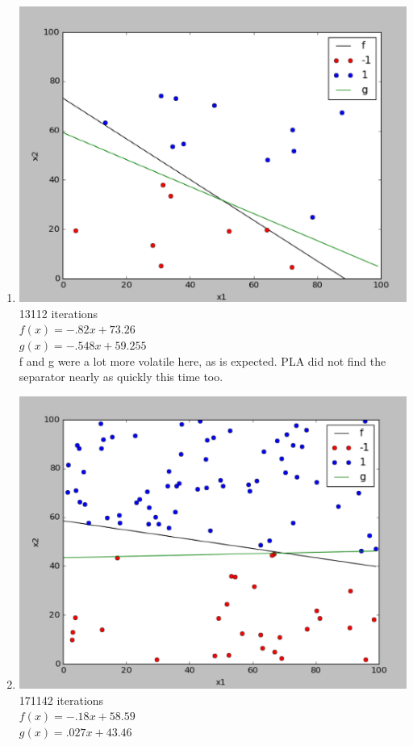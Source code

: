 \documentclass[12pt]{article}
\begin{document}
\begin{enumerate}[label=(\alph*)]
	\item \includegraphics[scale=.5]{1-4-5.png}
	\\ 13112 iterations
	\\ $f(x) = -.82x + 73.26$
	\\ $g(x) = -.548x + 59.255$
	\\ f and g were a lot more volatile here, as is expected. PLA did not find the separator nearly as quickly this time too.
	\item \includegraphics[scale=.5]{1-4-3.png}
	\\ 171142 iterations
	\\ $f(x) = -.18x + 58.59$
	\\ $g(x) = .027x + 43.46$

\end{enumerate}
\end{document}
